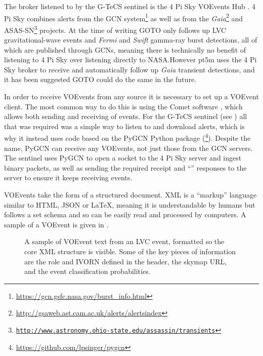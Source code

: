 \begin{colsection}
The broker listened to by the G-TeCS sentinel is the 4 Pi Sky VOEvents Hub \citep{4pisky}. 4 Pi Sky combines alerts from the GCN system\footnote{\url{https://gcn.gsfc.nasa.gov/burst_info.html}} as well as from the \textit{Gaia}\footnote{\url{http://gsaweb.ast.cam.ac.uk/alerts/alertsindex}} and ASAS-SN\footnote{\href{http://www.astronomy.ohio-state.edu/~assassin/transients}{\texttt{http://www.astronomy.ohio-state.edu/\raisebox{0.5ex}{\texttildelow}assassin/transients}}} projects. At the time of writing GOTO only follows up LVC gravitational-wave events and \textit{Fermi} and \textit{Swift} gamma-ray burst detections, all of which are published through GCNs, meaning there is technically no benefit of listening to 4 Pi Sky over listening directly to NASA.\@ However pt5m uses the 4 Pi Sky broker to receive and automatically follow up \textit{Gaia} transient detections, and it has been suggested GOTO could do the same in the future.

In order to receive VOEvents from any source it is necessary to set up a VOEvent client. The most common way to do this is using the Comet software \citep{comet}, which allows both sending and receiving of events. For the G-TeCS sentinel (see ) all that was required was a simple way to listen to and download alerts, which is why it instead uses code based on the PyGCN Python package (\footnote{\url{https://github.com/lpsinger/pygcn}}). Despite the name, PyGCN can receive any VOEvents, not just those from the GCN servers. The sentinel uses PyGCN to open a socket to the 4 Pi Sky server and ingest binary packets, as well as sending the required receipt and ``'' responses to the server to ensure it keeps receiving events.

VOEvents take the form of a structured  document. XML is a ``markup'' language similar to HTML, JSON or \LaTeX, meaning it is understandable by humans but follows a set schema and so can be easily read and processed by computers. A sample of a VOEvent is given in .

\begin{figure}[p]
    
    \caption[VOEvent XML sample]{
        A sample of VOEvent text from an LVC event, formatted so the core XML structure is visible. Some of the key pieces of information are the role and IVORN defined in the header, the skymap URL, and the event classification probabilities.
    }\label{fig:voevent_xml}
\end{figure}

\newpage

\end{colsection}

